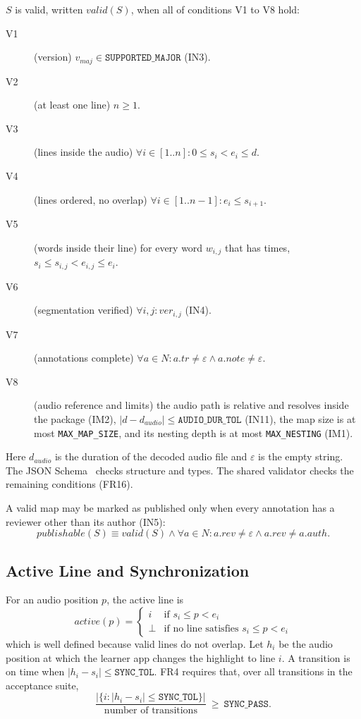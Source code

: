 \documentclass[12pt]{article}
\newcommand{\cn}[1]{\texttt{#1}}
\begin{document}
$S$ is valid, written $\mathit{valid}(S)$, when all of conditions V1 to V8
hold:
\begin{description}
\item[V1] (version) $v_{\mathit{maj}} \in \cn{SUPPORTED\_MAJOR}$ (IN3).
\item[V2] (at least one line) $n \ge 1$.
\item[V3] (lines inside the audio) $\forall i \in [1..n] : 0 \le s_i < e_i
\le d$.
\item[V4] (lines ordered, no overlap) $\forall i \in [1..n-1] : e_i \le
s_{i+1}$.
\item[V5] (words inside their line) for every word $w_{i,j}$ that has times,
$s_i \le s_{i,j} < e_{i,j} \le e_i$.
\item[V6] (segmentation verified) $\forall i, j : \mathit{ver}_{i,j}$ (IN4).
\item[V7] (annotations complete) $\forall a \in N : a.\mathit{tr} \neq
\varepsilon \wedge a.\mathit{note} \neq \varepsilon$.
\item[V8] (audio reference and limits) the audio path is relative and
resolves inside the package (IM2),
$|d - d_{\mathit{audio}}| \le \cn{AUDIO\_DUR\_TOL}$ (IN11), the map size is
at most \cn{MAX\_MAP\_SIZE}, and its nesting depth is at most
\cn{MAX\_NESTING} (IM1).
\end{description}
Here $d_{\mathit{audio}}$ is the duration of the decoded audio file and
$\varepsilon$ is the empty string. The JSON Schema~\cite{JSONSchema2020}
checks structure and types. The shared validator checks the remaining
conditions (FR16).

A valid map may be marked as published only when every annotation has a
reviewer other than its author (IN5):
\[
\mathit{publishable}(S) \equiv \mathit{valid}(S) \wedge \forall a \in N :
a.\mathit{rev} \neq \varepsilon \wedge a.\mathit{rev} \neq a.\mathit{auth}.
\]

\subsection{Active Line and Synchronization}
For an audio position $p$, the active line is
\[
\mathit{active}(p) =
\begin{cases}
i & \text{if } s_i \le p < e_i\\
\bot & \text{if no line satisfies } s_i \le p < e_i
\end{cases}
\]
which is well defined because valid lines do not overlap. Let $h_i$ be the
audio position at which the learner app changes the highlight to line $i$.
A transition is on time when $|h_i - s_i| \le \cn{SYNC\_TOL}$. FR4 requires
that, over all transitions in the acceptance suite,
\[
\frac{|\{ i : |h_i - s_i| \le \cn{SYNC\_TOL} \}|}{\text{number of transitions}}
\ \ge\ \cn{SYNC\_PASS}.
\]
\end{document}
